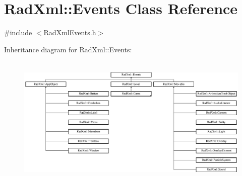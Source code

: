 \hypertarget{class_rad_xml_1_1_events}{\section{Rad\-Xml\-:\-:Events Class Reference}
\label{class_rad_xml_1_1_events}
}


{\ttfamily \#include $<$Rad\-Xml\-Events.\-h$>$}

Inheritance diagram for Rad\-Xml\-:\-:Events\-:\begin{figure}[H]
\begin{center}
\leavevmode
\includegraphics[height=6.383420cm]{class_rad_xml_1_1_events}
\end{center}
\end{figure}
